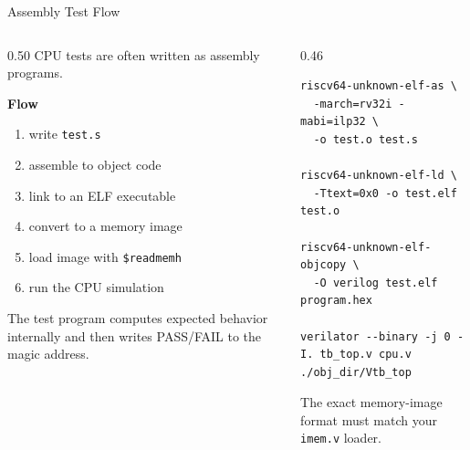 \documentclass[aspectratio=169,10pt]{beamer}
\begin{document}
\begin{frame}[fragile]{Assembly Test Flow}
  \begin{columns}[T]
    \begin{column}{0.50\textwidth}
      CPU tests are often written as assembly programs.

      \vspace{0.7em}
      \textbf{Flow}
      \begin{enumerate}
        \item write \texttt{test.s}
        \item assemble to object code
        \item link to an ELF executable
        \item convert to a memory image
        \item load image with \texttt{\$readmemh}
        \item run the CPU simulation
      \end{enumerate}

      \vspace{0.6em}
      The test program computes expected behavior internally and then writes PASS/FAIL to the magic address.
    \end{column}
    \begin{column}{0.46\textwidth}
\begin{lstlisting}[language=Shell]
riscv64-unknown-elf-as \
  -march=rv32i -mabi=ilp32 \
  -o test.o test.s

riscv64-unknown-elf-ld \
  -Ttext=0x0 -o test.elf test.o

riscv64-unknown-elf-objcopy \
  -O verilog test.elf program.hex

verilator --binary -j 0 -I. tb_top.v cpu.v
./obj_dir/Vtb_top
\end{lstlisting}
      \vspace{0.4em}
      \small
      The exact memory-image format must match your \texttt{imem.v} loader.
    \end{column}
  \end{columns}
\end{frame}
\end{document}
